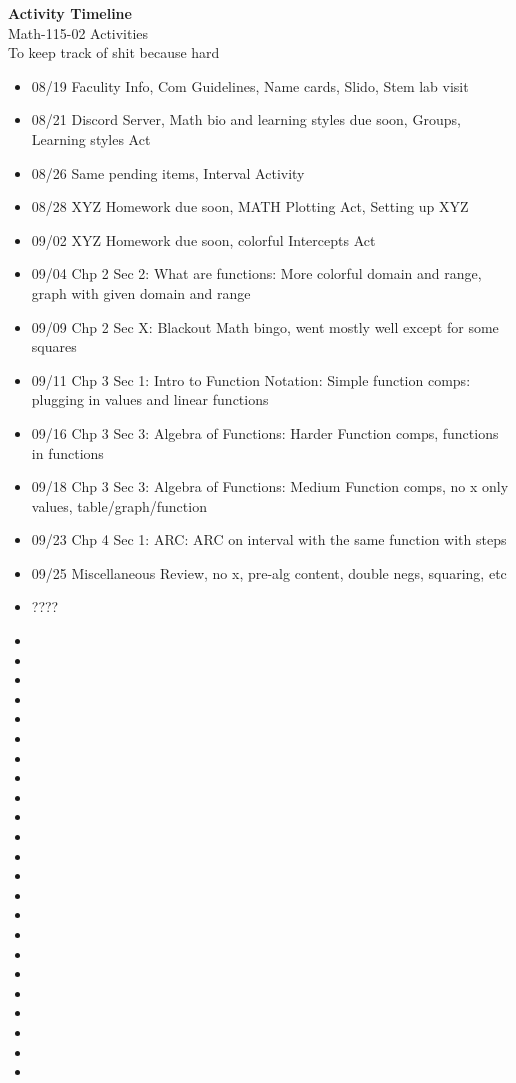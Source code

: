 \documentclass{article}
\begin{document}
\begin{center}
    \Large \textbf{Activity Timeline} \\
    \vspace{0.2cm}
    \normalsize Math-115-02 Activities\\
    \normalsize To keep track of shit because hard
\end{center}
\vspace{1cm} %
\begin{itemize}
    \item 08/19 Faculity Info, Com Guidelines, Name cards, Slido, Stem lab visit
    \item 08/21 Discord Server, Math bio and learning styles due soon, Groups, Learning styles Act 
    \item 08/26 Same pending items, Interval Activity
    \item 08/28 XYZ Homework due soon, MATH Plotting Act, Setting up XYZ
    \item 09/02 XYZ Homework due soon, colorful Intercepts Act
    \item 09/04 Chp 2 Sec 2: What are functions: More colorful domain and range, graph with given domain and range
    \item 09/09 Chp 2 Sec X: Blackout Math bingo, went mostly well except for some squares
    \item 09/11 Chp 3 Sec 1: Intro to Function Notation: Simple function comps: plugging in values and linear functions
    \item 09/16 Chp 3 Sec 3: Algebra of Functions: Harder Function comps, functions in functions
    \item 09/18 Chp 3 Sec 3: Algebra of Functions: Medium Function comps, no x only values, table/graph/function
    \item 09/23 Chp 4 Sec 1: ARC: ARC on interval with the same function with steps
    \item 09/25 Miscellaneous Review, no x, pre-alg content, double negs, squaring, etc
    \item ????
    \item
    \item
    \item
    \item
    \item
    \item
    \item
    \item
    \item
    \item
    \item
    \item
    \item
    \item
    \item
    \item
    \item
    \item
    \item
    \item
    \item
    \item
    \item
\end{itemize}
\end{document}
